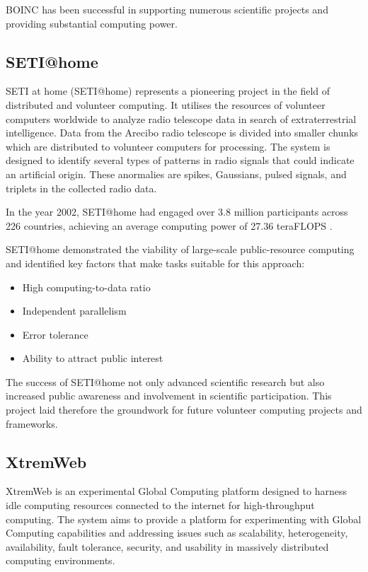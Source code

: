 BOINC has been successful in supporting numerous scientific projects and providing substantial computing power. \cite{relatedwork:boinc1}

\subsection{SETI@home}
\label{subsec:background:related_work:seti}
\ac{SETI} at home (\ac{SETI}@home) represents a pioneering project in the field of distributed and volunteer computing. It utilises the resources of volunteer computers worldwide to analyze radio telescope data in search of extraterrestrial intelligence. Data from the Arecibo radio telescope is divided into smaller chunks which are distributed to volunteer computers for processing. The system is designed to identify several types of patterns in radio signals that could indicate an artificial origin. These anormalies are spikes, Gaussians, pulsed signals, and triplets in the collected radio data. \cite{relatedwork:seti}

In the year 2002, \ac{SETI}@home had engaged over 3.8 million participants across 226 countries, achieving an average computing power of 27.36 teraFLOPS \cite{relatedwork:seti}.

\ac{SETI}@home demonstrated the viability of large-scale public-resource computing and identified key factors that make tasks suitable for this approach:
\begin{itemize}
  \item High computing-to-data ratio
  \item Independent parallelism
  \item Error tolerance
  \item Ability to attract public interest
\end{itemize}
The success of \ac{SETI}@home not only advanced scientific research but also increased public awareness and involvement in scientific participation. This project laid therefore the groundwork for future volunteer computing projects and frameworks. \cite{relatedwork:seti}

\subsection{XtremWeb}
\label{subsec:background:related_work:xtremweb}
XtremWeb is an experimental Global Computing platform designed to harness idle computing resources connected to the internet for high-throughput computing. The system aims to provide a platform for experimenting with Global Computing capabilities and addressing issues such as scalability, heterogeneity, availability, fault tolerance, security, and usability in massively distributed computing environments. \cite{relatedwork:xtremweb}

